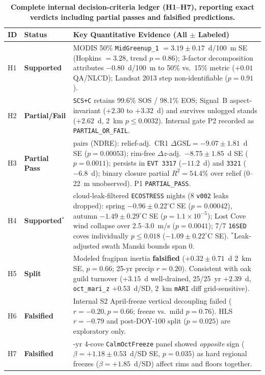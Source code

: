\begin{table}[t]
\centering
\begin{threeparttable}
\caption{\textbf{Complete internal decision-criteria ledger (H1--H7), reporting exact verdicts including partial passes and falsified predictions.}}
\label{tab:hypothesis_ledger}
\small
\begin{tabularx}{\linewidth}{@{} l l >{\raggedright\arraybackslash}X @{}}
\toprule
ID & Status & Key Quantitative Evidence (All $\pm$ Labeled) \\
\midrule
H1 & \textbf{Supported} & MODIS 50\% \texttt{MidGreenup\_1} $= 3.19 \pm 0.17$~d/100~m SE (Hopkins $= 3.28$, trend $p=0.86$); 3-factor decomposition attributes $-0.80$~d/100~m to 50\% vs.\ 15\% metric ($+0.01$ QA/NLCD); Landsat 2013 step non-identifiable ($p=0.91$). \\
H2 & \textbf{Partial/Fail} & \texttt{SCS+C} retains 99.6\% SOS / 98.1\% EOS; Signal~B aspect-invariant ($+2.30$ to $+3.32$~d) and survives unlogged stands ($+2.62$~d, 2~km $p \le 0.0032$). Internal gate P2 recorded as \texttt{PARTIAL\_OR\_FAIL}. \\
H3 & \textbf{Partial Pass} & 11 pairs (NDRE): relief-adj.\ CR1 $\Delta\text{GSL}=-9.07 \pm 1.81$~d SE ($p=0.00053$); rim-free $\Delta z$-adj.\ $-8.75 \pm 1.85$~d SE ($p=0.0011$); persists in \texttt{EVT 3317} ($-11.2$~d) and \texttt{3321} ($-6.8$~d); binary closure partial $R^2=54.4\%$ over relief (0--22~m unobserved). P1 \texttt{PARTIAL\_PASS}. \\
H4 & \textbf{Supported$^*$} & 52 cloud-leak-filtered \texttt{ECOSTRESS} nights (8 \texttt{v002} leaks dropped): spring $-0.96 \pm 0.22^\circ$C SE ($p=0.00042$), autumn $-1.49 \pm 0.29^\circ$C SE ($p=1.1{\times}10^{-5}$); Lost Cove wind collapse over 2.5--3.0~m/s ($p=0.0041$); 7/7 \texttt{16SED} coves individually $p \le 0.018$ ($-1.09 \pm 0.22^\circ$C SE). $^*$Leak-adjusted swath Manski bounds span 0. \\
H5 & \textbf{Split} & Modeled fragipan inertia \textbf{falsified} ($+0.32 \pm 0.71$~d 2~km SE, $p=0.66$; 25-yr precip $r=0.20$). Consistent with oak guild turnover ($+3.15$~d well-drained, 25/25~yr $+2.39$~d, \texttt{oct\_mari\_z} $+0.53$~d/SD, 2~km \texttt{mARI} diff grid-sensitive). \\
H6 & \textbf{Falsified} & Internal S2 April-freeze vertical decoupling failed ($r=-0.20, p=0.66$; freeze vs.\ mild $p=0.76$). HLS $r=-0.79$ and post-DOY-100 split ($p=0.025$) are exploratory only. \\
H7 & \textbf{Falsified} & 25-yr 4-cove \texttt{CalmOctFreeze} panel showed \emph{opposite} sign ($\beta=+1.18 \pm 0.53$~d/SD SE, $p=0.035$) as hard regional freezes ($\beta=+1.85$~d/SD) affect rims and floors together. \\
\bottomrule
\end{tabularx}
\end{threeparttable}
\end{table}
